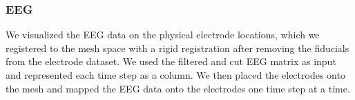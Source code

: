 \subsubsection{EEG}

We visualized the EEG data on the physical electrode locations, which we registered to the mesh space with a rigid registration after removing the fiducials from the electrode dataset. We used the filtered and cut EEG matrix as input and represented each time step as a column. We then placed the electrodes onto the mesh and mapped the EEG data onto the electrodes one time step at a time.